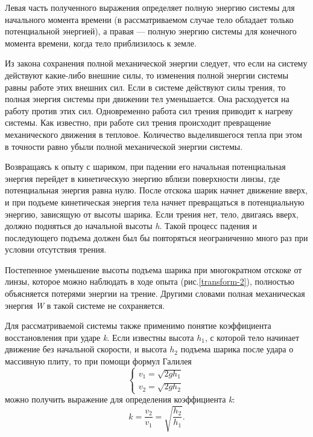 \documentclass[14pt,a4paper,oneside]{extarticle}	%
\begin{document}
Левая часть полученного выражения определяет полную энергию системы для начального момента времени (в рассматриваемом случае тело обладает только потенциальной энергией), 
а правая — полную энергию системы для конечного момента времени, когда тело приблизилось к земле.

Из закона сохранения полной механической энергии следует, что 
если на систему действуют какие-либо внешние силы, то изменения полной энергии системы равны работе этих внешних сил. 
Если в системе действуют силы трения, то полная энергия системы при движении тел уменьшается.
Она расходуется на работу против этих сил.
Одновременно работа сил трения приводит к нагреву системы.
Как известно, при работе сил трения происходит превращение механического движения в тепловое.
Количество выделившегося тепла при этом в точности равно убыли полной механической энергии системы. 

Возвращаясь к опыту с шариком, при падении его начальная потенциальная энергия перейдет в кинетическую 
энергию вблизи поверхности линзы, где потенциальная энергия равна нулю.
После отскока шарик начнет движение вверх, и при подъеме кинетическая энергия тела начнет 
превращаться в потенциальную энергию, зависящую от высоты шарика.
Если трения нет, тело, двигаясь вверх, 
должно подняться до начальной высоты \textit{h}.
Такой процесс падения и последующего подъема должен был бы повторяться неограниченно много раз при условии отсутствия трения. 

Постепенное уменьшение высоты подъема шарика при многократном отскоке от линзы, которое можно 
наблюдать в ходе опыта (рис.\ref{transform-2}), полностью объясняется потерями энергии на 
трение.
Другими словами полная механическая энергия \textit{W} в такой системе не сохраняется.

Для рассматриваемой системы также применимо понятие коэффициента восстановления  при ударе \textit{k}.
Если известны высота $ h_1 $, с которой тело начинает движение без начальной скорости, и высота $ h_2 $ подъема шарика после удара о массивную плиту, то при помощи формул Галилея
\begin{equation}
\begin{cases}
v_1=\sqrt{2gh_1} \\
v_2=\sqrt{2gh_2}
\end{cases}
\end{equation}
можно получить выражение для определения коэффициента \textit{k}:
\begin{equation}
k=\dfrac{v_2}{v_1}=\sqrt{\dfrac{h_2}{h_1}}.
\end{equation}
\end{document}
